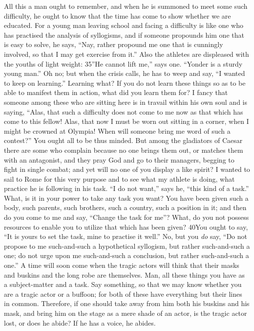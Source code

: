 All this a man ought to remember, and when he is summoned to meet some such difficulty, he ought to know that the time has come to show whether we are educated. For a young man leaving school and facing a difficulty is like one who has practised the analysis of syllogisms, and if someone propounds him one that is easy to solve, he says, ``Nay, rather propound me one that is cunningly involved, so that I may get exercise from it.'' Also the athletes are displeased with the youths of light weight: 35''He cannot lift me,'' says one. ``Yonder is a sturdy young man.'' Oh no; but when the crisis calls, he has to weep and say, ``I wanted to keep on learning.'' Learning what? If you do not learn these things so as to be able to manifest them in action, what did you learn them for? I fancy that someone among these who are sitting here is in travail within his own soul and is saying, ``Alas, that such a difficulty does not come to me now as that which has come to this fellow! Alas, that now I must be worn out sitting in a corner, when I might be crowned at Olympia! When will someone bring me word of such a contest?'' You ought all to be thus minded. But among the gladiators of Caesar there are some who complain because no one brings them out, or matches them with an antagonist, and they pray God and go to their managers, begging to fight in single combat; and yet will no one of you display a like spirit? I wanted to sail to Rome for this very purpose and to see what my athlete is doing, what practice he is following in his task. ``I do not want,'' says he, ``this kind of a task.'' What, is it in your power to take any task you want? You have been given such a body, such parents, such brothers, such a country, such a position in it; and then do you come to me and say, ``Change the task for me''? What, do you not possess resources to enable you to utilize that which has been given? 40You ought to say, ``It is yours to set the task, mine to practise it well.'' No, but you \emph{do} say, ``Do not propose to me such-and-such a hypothetical syllogism, but rather such-and-such a one; do not urge upon me such-and-such a conclusion, but rather such-and-such a one.'' A time will soon come when the tragic actors will think that their masks and buskins and the long robe are themselves. Man, all these things you have as a subject-matter and a task. Say something, so that we may know whether you are a tragic actor or a buffoon; for both of these have everything but their lines in common. Therefore, if one should take away from him both his buskins and his mask, and bring him on the stage as a mere shade of an actor, is the tragic actor lost, or does he abide? If he has a voice, he abides.

